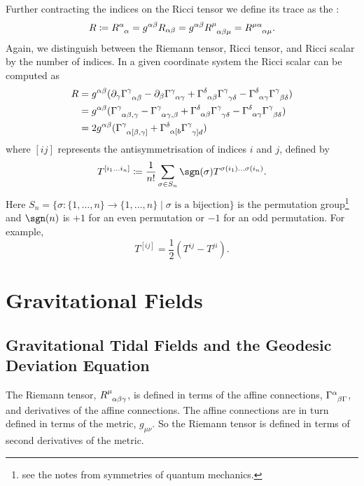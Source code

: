 \documentclass[fleqn]{NotesClass}
\newcommand*{\christoffel}[3]{\tensor{\Gamma}{^{#1}_{{#2}{#3}}}}
\begin{document}
    Further contracting the indices on the Ricci tensor we define its trace as the :
    \begin{equation}
        R \coloneqq \tensor{R}{^\alpha_\alpha} = g^{\alpha\beta}R_{\alpha\beta} = g^{\alpha\beta}\tensor{R}{^\mu_{\alpha\beta\mu}} = \tensor{R}{^{\mu\alpha}_{\alpha\mu}}.
    \end{equation}
    Again, we distinguish between the Riemann tensor, Ricci tensor, and Ricci scalar by the number of indices.
    In a given coordinate system the Ricci scalar can be computed as
    \begin{align}
        R &= g^{\alpha\beta} (\partial_\gamma \christoffel{\gamma}{\alpha}{\beta} - \partial_\beta\christoffel{\gamma}{\alpha}{\gamma} + \christoffel{\delta}{\alpha}{\beta}\christoffel{\gamma}{\gamma}{\delta} - \christoffel{\delta}{\alpha}{\gamma}\christoffel{\gamma}{\beta}{\delta})\\
        &= g^{\alpha\beta} (\christoffel{\gamma}{\alpha}{\beta,\gamma} - \christoffel{\gamma}{\alpha}{\gamma,\beta} + \christoffel{\delta}{\alpha}{\beta} \christoffel{\gamma}{\gamma}{\delta} - \christoffel{\delta}{\alpha}{\gamma}\christoffel{\gamma}{\beta}{\delta})\\
        &= 2 g^{\alpha\beta}(\christoffel{\gamma}{\alpha}{[\beta,\gamma]} + \christoffel{\delta}{\alpha}{[b} \christoffel{\gamma}{\gamma]}{d})
    \end{align}
    where \([ij]\) represents the antisymmetrisation of indices \(i\) and \(j\), defined by
    \begin{equation}
        T^{[i_1\dotso i_n]} \coloneqq \frac{1}{n!} \sum_{\sigma \in S_n} \sgn(\sigma) T^{\sigma(i_1) \dotso \sigma(i_n)}.
    \end{equation}
    Here \(S_n = \{\sigma\colon \{1, \dotsc, n\} \to \{1, \dotsc, n\} \mid \sigma \text{ is a bijection}\}\) is the permutation group\footnote{see the notes from symmetries of quantum mechanics.} and \(\sgn(n)\) is \(+1\) for an even permutation or \(-1\) for an odd permutation.
    For example, 
    \begin{equation}
        T^{[ij]} = \frac{1}{2}(T^{ij} - T^{ji}).
    \end{equation}
    
    \chapter{Gravitational Fields}
    \section{Gravitational Tidal Fields and the Geodesic Deviation Equation}
    The Riemann tensor, \(\tensor{R}{^\mu_{\alpha\beta\gamma}}\), is defined in terms of the affine connections, \(\christoffel{\alpha}{\beta}{\Gamma}\), and derivatives of the affine connections.
    The affine connections are in turn defined in terms of the metric, \(g_{\mu\nu}\).
    So the Riemann tensor is defined in terms of second derivatives of the metric.
    
\end{document}
